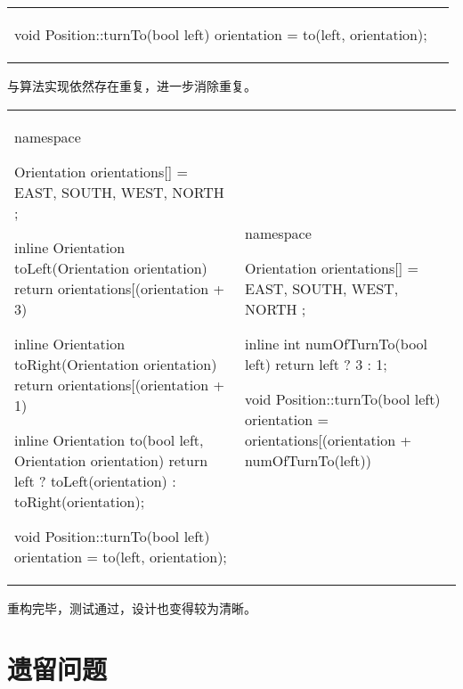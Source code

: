\begin{content}
\begin{tabular}{@{}p{} 
                 | p{}@{}}
\begin{c++}[caption={src/robot-cleaner/Position.cpp}]
void Position::turnTo(bool left)
{
    orientation = to(left, orientation);
}
\end{c++}
\end{tabular}

与算法实现依然存在重复，进一步消除重复。

\begin{tabular}{@{}p{} 
                 | p{}@{}}
\begin{c++}[caption={src/robot-cleaner/Position.cpp}]
namespace
{
    Orientation orientations[] = { EAST, SOUTH, WEST, NORTH };

    inline Orientation toLeft(Orientation orientation)
    {
        return orientations[(orientation + 3) %
    }
    
    inline Orientation toRight(Orientation orientation)
    {
        return orientations[(orientation + 1) %
    }

    inline Orientation to(bool left, Orientation orientation)
    {
        return left ? toLeft(orientation) : toRight(orientation);
    }
}

void Position::turnTo(bool left)
{
    orientation = to(left, orientation);
}
\end{c++}
&
\begin{c++}[caption={src/robot-cleaner/Position.cpp}]
namespace
{
    Orientation orientations[] = { EAST, SOUTH, WEST, NORTH };

    inline int numOfTurnTo(bool left)
    { return left ? 3 : 1; }
}

void Position::turnTo(bool left)
{
    orientation = orientations[(orientation + numOfTurnTo(left)) %
}
\end{c++}
\end{tabular}
 
重构完毕，测试通过，设计也变得较为清晰。
    
\end{content}

\section{遗留问题}

